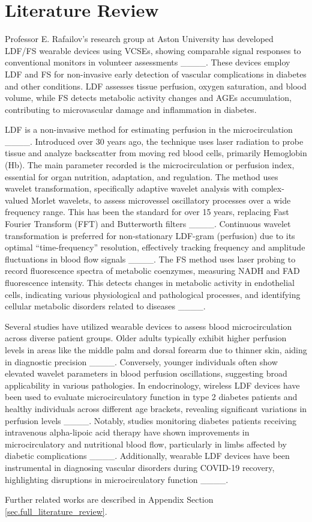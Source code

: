 \section{Literature Review}
\label{sec.literature_review}

Professor E. Rafailov's research group at Aston University has developed LDF/FS wearable devices using VCSEs, showing comparable signal responses to conventional monitors in volunteer assessments ____. These devices employ LDF and FS for non-invasive early detection of vascular complications in diabetes and other conditions. LDF assesses tissue perfusion, oxygen saturation, and blood volume, while FS detects metabolic activity changes and AGEs accumulation, contributing to microvascular damage and inflammation in diabetes. 

LDF is a non-invasive method for estimating perfusion in the microcirculation ____. Introduced over 30 years ago, the technique uses laser radiation to probe tissue and analyze backscatter from moving red blood cells, primarily Hemoglobin (Hb). The main parameter recorded is the microcirculation or perfusion index, essential for organ nutrition, adaptation, and regulation. The method uses wavelet transformation, specifically adaptive wavelet analysis with complex-valued Morlet wavelets, to assess microvessel oscillatory processes over a wide frequency range. This has been the standard for over 15 years, replacing Fast Fourier Transform (FFT) and Butterworth filters ____. Continuous wavelet transformation is preferred for non-stationary LDF-gram (perfusion) due to its optimal ``time-frequency'' resolution, effectively tracking frequency and amplitude fluctuations in blood flow signals ____. The FS method uses laser probing to record fluorescence spectra of metabolic coenzymes, measuring NADH and FAD fluorescence intensity. This detects changes in metabolic activity in endothelial cells, indicating various physiological and pathological processes, and identifying cellular metabolic disorders related to diseases ____. 



Several studies have utilized wearable devices to assess blood microcirculation across diverse patient groups. Older adults typically exhibit higher perfusion levels in areas like the middle palm and dorsal forearm due to thinner skin, aiding in diagnostic precision ____. Conversely, younger individuals often show elevated wavelet parameters in blood perfusion oscillations, suggesting broad applicability in various pathologies. In endocrinology, wireless LDF devices have been used to evaluate microcirculatory function in type 2 diabetes patients and healthy individuals across different age brackets, revealing significant variations in perfusion levels ____. Notably, studies monitoring diabetes patients receiving intravenous alpha-lipoic acid therapy have shown improvements in microcirculatory and nutritional blood flow, particularly in limbs affected by diabetic complications ____. Additionally, wearable LDF devices have been instrumental in diagnosing vascular disorders during COVID-19 recovery, highlighting disruptions in microcirculatory function ____.

Further related works are described in Appendix Section \ref{sec.full_literature_review}.